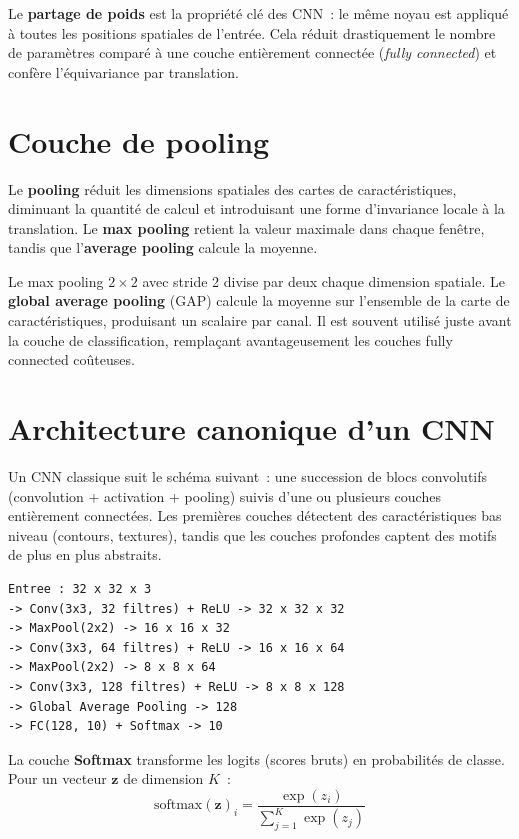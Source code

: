 \documentclass[a4paper,11pt,twoside]{book}
\newcommand{\vect}[1]{\boldsymbol{#1}}
\begin{document}
Le \textbf{partage de poids} est la propriété clé des CNN~: le même noyau est appliqué à toutes les positions spatiales de l'entrée. Cela réduit drastiquement le nombre de paramètres comparé à une couche entièrement connectée (\textit{fully connected}) et confère l'équivariance par translation.

\section{Couche de pooling}

Le \textbf{pooling} réduit les dimensions spatiales des cartes de caractéristiques, diminuant la quantité de calcul et introduisant une forme d'invariance locale à la translation. Le \textbf{max pooling} retient la valeur maximale dans chaque fenêtre, tandis que l'\textbf{average pooling} calcule la moyenne.

Le max pooling $2 \times 2$ avec stride 2 divise par deux chaque dimension spatiale. Le \textbf{global average pooling} (GAP) calcule la moyenne sur l'ensemble de la carte de caractéristiques, produisant un scalaire par canal. Il est souvent utilisé juste avant la couche de classification, remplaçant avantageusement les couches fully connected coûteuses.

\section{Architecture canonique d'un CNN}

Un CNN classique suit le schéma suivant~: une succession de blocs convolutifs (convolution + activation + pooling) suivis d'une ou plusieurs couches entièrement connectées. Les premières couches détectent des caractéristiques bas niveau (contours, textures), tandis que les couches profondes captent des motifs de plus en plus abstraits.

\begin{lstlisting}[caption={Architecture d'un CNN simple pour CIFAR-10}]
Entree : 32 x 32 x 3
-> Conv(3x3, 32 filtres) + ReLU -> 32 x 32 x 32
-> MaxPool(2x2) -> 16 x 16 x 32
-> Conv(3x3, 64 filtres) + ReLU -> 16 x 16 x 64
-> MaxPool(2x2) -> 8 x 8 x 64
-> Conv(3x3, 128 filtres) + ReLU -> 8 x 8 x 128
-> Global Average Pooling -> 128
-> FC(128, 10) + Softmax -> 10
\end{lstlisting}

La couche \textbf{Softmax} transforme les logits (scores bruts) en probabilités de classe. Pour un vecteur $\vect{z}$ de dimension $K$~:
\[
\text{softmax}(\vect{z})_i = \frac{\exp(z_i)}{\sum_{j=1}^{K} \exp(z_j)}
\]
\end{document}
